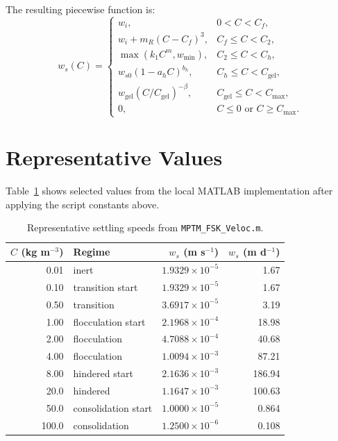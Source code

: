 \documentclass[11pt]{article}
\begin{document}
The resulting piecewise function is:
\begin{equation}
w_s(C)=
\begin{cases}
w_i, & 0 < C < C_f, \\
w_i + m_R(C-C_f)^3, & C_f \le C < C_2, \\
\max(k_1 C^m, w_{\min}), & C_2 \le C < C_h, \\
w_{s0}(1-a_h C)^{b_h}, & C_h \le C < C_{\mathrm{gel}}, \\
w_{\mathrm{gel}}\left(C/C_{\mathrm{gel}}\right)^{-\beta},
  & C_{\mathrm{gel}} \le C < C_{\max}, \\
0, & C \le 0 \text{ or } C \ge C_{\max}.
\end{cases}
\end{equation}

\section*{Representative Values}

Table~\ref{tab:values} shows selected values from the local MATLAB
implementation after applying the script constants above.

\begin{table}[h]
\centering
\caption{Representative settling speeds from \texttt{MPTM\_FSK\_Veloc.m}.}
\label{tab:values}
\begin{tabular}{rlrr}
\toprule
$C$ (kg m$^{-3}$) & Regime & $w_s$ (m s$^{-1}$) & $w_s$ (m d$^{-1}$) \\
\midrule
0.01 & inert & $1.9329\times10^{-5}$ & 1.67 \\
0.10 & transition start & $1.9329\times10^{-5}$ & 1.67 \\
0.50 & transition & $3.6917\times10^{-5}$ & 3.19 \\
1.00 & flocculation start & $2.1968\times10^{-4}$ & 18.98 \\
2.00 & flocculation & $4.7088\times10^{-4}$ & 40.68 \\
4.00 & flocculation & $1.0094\times10^{-3}$ & 87.21 \\
8.00 & hindered start & $2.1636\times10^{-3}$ & 186.94 \\
20.0 & hindered & $1.1647\times10^{-3}$ & 100.63 \\
50.0 & consolidation start & $1.0000\times10^{-5}$ & 0.864 \\
100.0 & consolidation & $1.2500\times10^{-6}$ & 0.108 \\
\bottomrule
\end{tabular}
\end{table}
\end{document}
